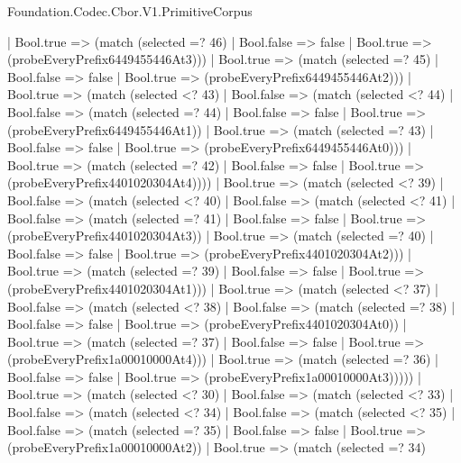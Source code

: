 \begin{lexlean}{Foundation.Codec.Cbor.V1.PrimitiveCorpus}
\begin{semanticmodule}
{                  | Bool.true => (match (selected =? 46)
                    | Bool.false => false
                    | Bool.true => (probeEveryPrefix6449455446At3)))
                | Bool.true => (match (selected =? 45)
                  | Bool.false => false
                  | Bool.true => (probeEveryPrefix6449455446At2)))
              | Bool.true => (match (selected <? 43)
                | Bool.false => (match (selected <? 44)
                  | Bool.false => (match (selected =? 44)
                    | Bool.false => false
                    | Bool.true => (probeEveryPrefix6449455446At1))
                  | Bool.true => (match (selected =? 43)
                    | Bool.false => false
                    | Bool.true => (probeEveryPrefix6449455446At0)))
                | Bool.true => (match (selected =? 42)
                  | Bool.false => false
                  | Bool.true => (probeEveryPrefix4401020304At4))))
            | Bool.true => (match (selected <? 39)
              | Bool.false => (match (selected <? 40)
                | Bool.false => (match (selected <? 41)
                  | Bool.false => (match (selected =? 41)
                    | Bool.false => false
                    | Bool.true => (probeEveryPrefix4401020304At3))
                  | Bool.true => (match (selected =? 40)
                    | Bool.false => false
                    | Bool.true => (probeEveryPrefix4401020304At2)))
                | Bool.true => (match (selected =? 39)
                  | Bool.false => false
                  | Bool.true => (probeEveryPrefix4401020304At1)))
              | Bool.true => (match (selected <? 37)
                | Bool.false => (match (selected <? 38)
                  | Bool.false => (match (selected =? 38)
                    | Bool.false => false
                    | Bool.true => (probeEveryPrefix4401020304At0))
                  | Bool.true => (match (selected =? 37)
                    | Bool.false => false
                    | Bool.true => (probeEveryPrefix1a00010000At4)))
                | Bool.true => (match (selected =? 36)
                  | Bool.false => false
                  | Bool.true => (probeEveryPrefix1a00010000At3)))))
          | Bool.true => (match (selected <? 30)
            | Bool.false => (match (selected <? 33)
              | Bool.false => (match (selected <? 34)
                | Bool.false => (match (selected <? 35)
                  | Bool.false => (match (selected =? 35)
                    | Bool.false => false
                    | Bool.true => (probeEveryPrefix1a00010000At2))
                  | Bool.true => (match (selected =? 34)
}
\end{semanticmodule}
\end{lexlean}
